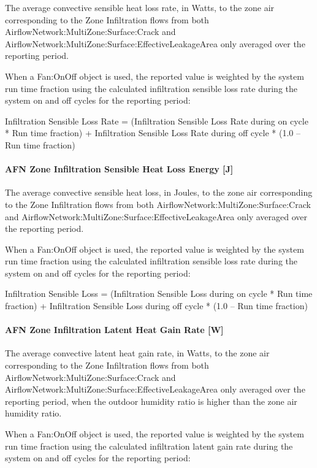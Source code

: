 The average convective sensible heat loss rate, in Watts, to the zone air corresponding to the Zone Infiltration flows from both AirflowNetwork:MultiZone:Surface:Crack and AirflowNetwork:MultiZone:Surface:EffectiveLeakageArea only averaged over the reporting period.

When a Fan:OnOff object is used, the reported value is weighted by the system run time fraction using the calculated infiltration sensible loss rate during the system on and off cycles for the reporting period:

Infiltration Sensible Loss Rate = (Infiltration Sensible Loss Rate during on cycle * Run time fraction) + Infiltration Sensible Loss Rate during off cycle * (1.0 -- Run time fraction)

\paragraph{AFN Zone Infiltration Sensible Heat Loss Energy {[}J{]}}\label{afn-zone-infiltration-sensible-heat-loss-energy-j}

The average convective sensible heat loss, in Joules, to the zone air corresponding to the Zone Infiltration flows from both AirflowNetwork:MultiZone:Surface:Crack and AirflowNetwork:MultiZone:Surface:EffectiveLeakageArea only averaged over the reporting period.

When a Fan:OnOff object is used, the reported value is weighted by the system run time fraction using the calculated infiltration sensible loss rate during the system on and off cycles for the reporting period:

Infiltration Sensible Loss = (Infiltration Sensible Loss during on cycle * Run time fraction) + Infiltration Sensible Loss during off cycle * (1.0 -- Run time fraction)

\paragraph{AFN Zone Infiltration Latent Heat Gain Rate {[}W{]}}\label{afn-zone-infiltration-latent-heat-gain-rate-w}

The average convective latent heat gain rate, in Watts, to the zone air corresponding to the Zone Infiltration flows from both AirflowNetwork:MultiZone:Surface:Crack and AirflowNetwork:MultiZone:Surface:EffectiveLeakageArea only averaged over the reporting period, when the outdoor humidity ratio is higher than the zone air humidity ratio.

When a Fan:OnOff object is used, the reported value is weighted by the system run time fraction using the calculated infiltration latent gain rate during the system on and off cycles for the reporting period:

